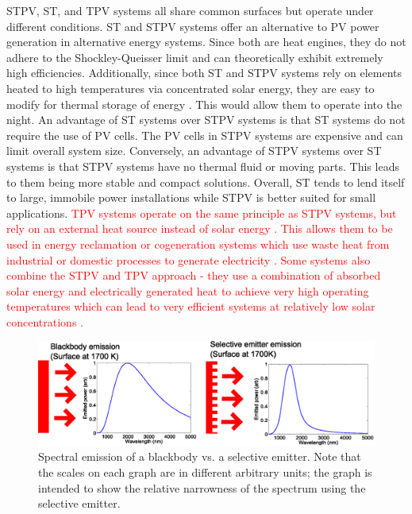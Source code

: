 \documentclass[review]{elsarticle}
\begin{document}
STPV, ST, and TPV systems all share common surfaces but operate under different conditions.  ST and STPV systems offer an alternative to PV power generation in alternative energy systems.  Since both are heat engines, they do not adhere to the Shockley-Queisser limit and can theoretically exhibit extremely high efficiencies.  Additionally, since both ST and STPV systems rely on elements heated to high temperatures via concentrated solar energy, they are easy to modify for thermal storage of energy \textcolor{red}{\cite{Night_time_Performance}}.  This would allow them to operate into the night.  An advantage of ST systems over STPV systems is that ST systems do not require the use of PV cells.  The PV cells in STPV systems are expensive and can limit overall system size.  Conversely, an advantage of STPV systems over ST systems is that STPV systems have no thermal fluid or moving parts.  This leads to them being more stable and compact solutions.  Overall, ST tends to lend itself to large, immobile power installations while STPV is better suited for small applications.\textcolor{red}{  TPV systems operate on the same principle as STPV systems, but rely on an external heat source instead of solar energy \cite{Prototype_TPV}.  This allows them to be used in energy reclamation or cogeneration systems which use waste heat from industrial or domestic processes to generate electricity \cite{Low_Bandgap,micro_rad,TPV_review}.  Some systems also combine the STPV and TPV approach - they use a combination of absorbed solar energy and electrically generated heat to achieve very high operating temperatures which can lead to very efficient systems at relatively low solar concentrations \cite{Thin_Film_Semiconductor_SolarEnergyJournal}.}

\begin{figure}[ht]
	\includegraphics[width=1\textwidth]{gfig_bbs}
	\caption{\label{gfig_bbs} Spectral emission of a blackbody vs. a selective emitter.  Note that the scales on each graph are in different arbitrary units; the graph is intended to show the relative narrowness of the spectrum using the selective emitter.}
\end{figure}
\end{document}
